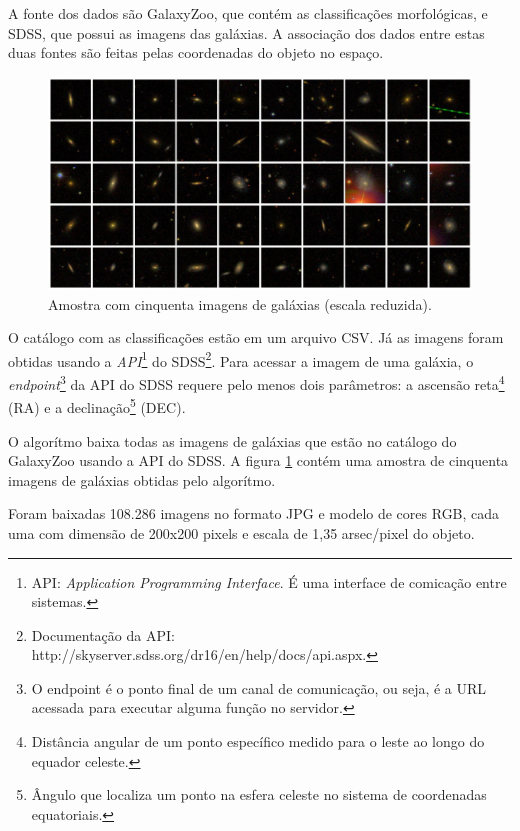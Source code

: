 A fonte dos dados são GalaxyZoo, que contém as classificações morfológicas, e SDSS, que possui as imagens das galáxias. A associação dos dados entre estas duas fontes são feitas pelas coordenadas do objeto no espaço.

\begin{figure}[h!]
  \centering
  \includegraphics[width=\textwidth]{figures/galaxy_grid.jpg}
  \caption{Amostra com cinquenta imagens de galáxias (escala reduzida).}
  \label{fig:galaxy_grid}
\end{figure}

O catálogo com as classificações estão em um arquivo CSV. Já as imagens foram obtidas usando a \emph{API}\footnote{API: \emph{Application Programming Interface}. É uma interface de comicação entre sistemas.} do SDSS\footnote{Documentação da API: http://skyserver.sdss.org/dr16/en/help/docs/api.aspx.}. Para acessar a imagem de uma galáxia, o \emph{endpoint}\footnote{O endpoint é o ponto final de um canal de comunicação, ou seja, é a URL acessada para executar alguma função no servidor.} da API do SDSS requere pelo menos dois parâmetros: a ascensão reta\footnote{Distância angular de um ponto específico medido para o leste ao longo do equador celeste.} (RA) e a declinação\footnote{Ângulo que localiza um ponto na esfera celeste no sistema de coordenadas equatoriais.} (DEC).

O algorítmo\cite{cardoso2020} baixa todas as imagens de galáxias que estão no catálogo do GalaxyZoo usando a API do SDSS. A figura \ref{fig:galaxy_grid} contém uma amostra de cinquenta imagens de galáxias obtidas pelo algorítmo.

Foram baixadas 108.286 imagens no formato JPG e modelo de cores RGB, cada uma com dimensão de 200x200 pixels e escala de 1,35 arsec/pixel do objeto.

